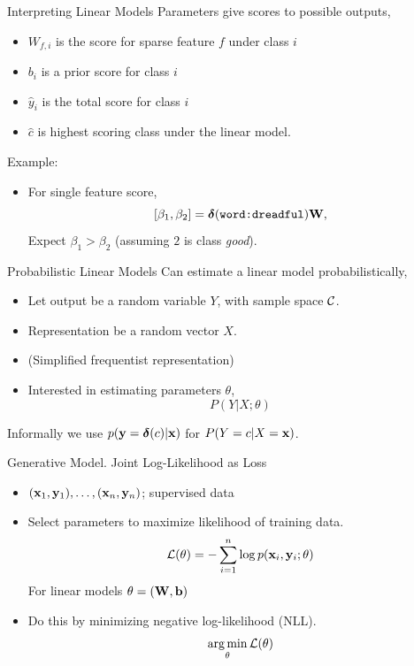 \documentclass{beamer}
\begin{document}
\begin{frame}{Interpreting Linear Models}
  Parameters give scores to possible outputs,
  \begin{itemize}
  \item $W_{f, i}$ is the score for sparse feature $f$ under class $i$
  \item $b_i$ is a prior score for class $i$  
  \item $\hat{y}_i$ is the total score for class $i$
  \item $\hat{c}$ is highest scoring class under the linear model.
  \end{itemize}

  Example:
  \begin{itemize}
  \item For single feature score, \[[\beta_1, \beta_2 ] = \boldsymbol{\delta}(\texttt{word:dreadful}) \mathbf{W},\]
    Expect $\beta_1 > \beta_2$ (assuming $2$ is class \textit{good}). 
    
  \end{itemize}
\end{frame}



\begin{frame}{Probabilistic Linear Models} 
  Can estimate a linear model probabilistically,

  \begin{itemize}
  \item Let output be a random variable $Y$, with sample space $\mathcal{C}$. 
  \item Representation be a random vector $X$. 
  \item (Simplified frequentist representation)
  \item Interested in estimating parameters $\theta$,
      \[ P(Y | X; \theta) \] 
  \end{itemize}
  Informally we use $p(\mathbf{y}=\boldsymbol{\delta}(c) | \mathbf{x})$ for 
  $P(Y = c | X = \mathbf{x})$.
  
\end{frame}



\begin{frame}{Generative Model. Joint Log-Likelihood as Loss } 
  \begin{itemize}
  \item $(\mathbf{x}_1, \mathbf{y}_1), \ldots, (\mathbf{x}_n, \mathbf{y}_n)$; supervised data
  \item Select parameters to maximize likelihood of training data.
    \[ \mathcal{L}(\theta) =  - \sum_{i=1}^n \log p(\mathbf{x}_i, \mathbf{y}_i; \theta) \] 
  For linear models $\theta = (\mathbf{W}, \mathbf{b})$ 

  \item Do this by minimizing negative log-likelihood (NLL).
    \[ \argmin_\theta \mathcal{L}(\theta)\] 
  \end{itemize}
\end{frame}
\end{document}
